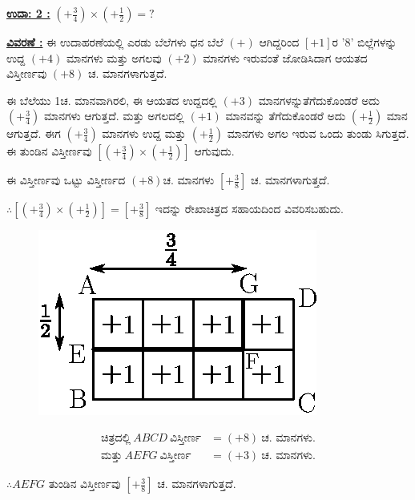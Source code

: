 \noindent
{\textbf{\underline{ಉದಾ: 2 :}}} $\left(+\frac{3}{4} \right) \times \left(+\frac{1}{2} \right) = ?$

\noindent
{\textbf{\underline{ವಿವರಣೆ :}}} ಈ ಉದಾಹರಣೆಯಲ್ಲಿ ಎರಡು ಬೆಲೆಗಳು ಧನ ಬೆಲೆ $(+)$ ಆಗಿದ್ದರಿಂದ $[+1]$ರ '8' ಬಿಲ್ಲೆಗಳನ್ನು ಉದ್ದ $(+4)$ ಮಾನಗಳು ಮತ್ತು ಅಗಲವು $(+2)$ ಮಾನಗಳು ಇರುವಂತೆ ಜೋಡಿಸಿದಾಗ ಆಯತದ ವಿಸ್ತೀರ್ಣವು $(+8)$ ಚ. ಮಾನಗಳಾಗುತ್ತದೆ. 

ಈ ಬೆಲೆಯು 1ಚ. ಮಾನವಾಗಿರಲಿ, ಈ ಆಯತದ ಉದ್ದದಲ್ಲಿ $(+3)$ ಮಾನಗಳನ್ನು\break  ತೆಗೆದುಕೊಂಡರೆ ಅದು $\left(+\frac{3}{4} \right)$ ಮಾನಗಳು ಆಗುತ್ತದೆ. ಮತ್ತು ಅಗಲದಲ್ಲಿ $(+1)$ ಮಾನವನ್ನು ತೆಗೆದುಕೊಂಡರೆ ಅದು $\left(+\frac{1}{2}\right)$ ಮಾನ ಆಗುತ್ತದೆ. ಈಗ $\left(+\frac{3}{4} \right)$ ಮಾನಗಳು ಉದ್ದ ಮತ್ತು $\left(+\frac{1}{2} \right)$ ಮಾನಗಳು ಅಗಲ ಇರುವ ಒಂದು ತುಂಡು ಸಿಗುತ್ತದೆ. ಈ ತುಂಡಿನ ವಿಸ್ತೀರ್ಣವು $\left[\left(+\frac{3}{4}\right) \times \left(+\frac{1}{2}\right) \right]$ ಆಗುವುದು. 
  
ಈ ವಿಸ್ತೀರ್ಣವು ಒಟ್ಟು ವಿಸ್ತೀರ್ಣದ $(+8)$ಚ. ಮಾನಗಳು $\left[+\frac{3}{8}\right]$ ಚ. ಮಾನಗಳಾಗುತ್ತದೆ.
  
$\therefore \left[\left(+\frac{3}{4}\right) \times \left(+\frac{1}{2}\right) \right] = \left[+\frac{3}{8}\right]$ ಇದನ್ನು ರೇಖಾಚಿತ್ರದ ಸಹಾಯದಿಂದ ವಿವರಿಸ\-ಬಹುದು. 
\begin{figure}[H]
\centering
\includegraphics[scale=0.8]{src/figure/chap3/fig3-24b.eps}
\end{figure}
\vskip -1.2cm
\begin{align*}
\text{ಚಿತ್ರದಲ್ಲಿ}~ ABCD~ \text{ವಿಸ್ತೀರ್ಣ} & = (+8)~ \text{ಚ. ಮಾನಗಳು.}\\
\text{ಮತ್ತು}~ AEFG~ \text{ವಿಸ್ತೀರ್ಣ} & = (+3)~ \text{ಚ. ಮಾನಗಳು.}
\end{align*}

$\therefore AEFG$ ತುಂಡಿನ ವಿಸ್ತೀರ್ಣವು $\left[+\frac{3}{8}\right]$ ಚ. ಮಾನಗಳಾಗುತ್ತದೆ. 

